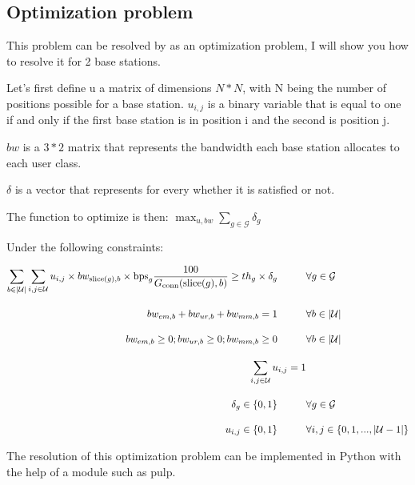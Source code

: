\documentclass[letterpaper]{article}
\begin{document}
\subsection{Optimization problem}

This problem can be resolved by as an optimization problem, I will show you how to resolve it for 2 base stations.

Let's first define u a matrix of dimensions $N*N$, with N being the number of positions possible for a base station.
$u_{i,j}$ is a binary variable that is equal to one if and only if the first base station is in position i and the second is position j.

$bw$ is a $3*2$ matrix that represents the bandwidth each base station allocates to each user class.

$\delta$ is a vector that represents for every whether it is satisfied or not.

The function to optimize is then: $\max_{u,bw}\sum_{g\in\mathcal{G}}\delta_g$

Under the following constraints:

\begin{subequations}
    \allowdisplaybreaks
    \begin{align}
        \sum_{b \in |\mathcal{U}|} \sum_{i, j \in \mathcal{U}} u_{i, j} \times bw_{\text{slice}(g), b} \times \text{bps}_g \frac{100}{G_{\text{conn}}(\text{slice}(g),b)} \nonumber
        \geq th_g \times \delta_g \hspace{1cm} &\forall g \in \mathcal{G} \\[1em]
        bw_{em,b} + bw_{ur,b} + bw_{mm,b} = 1 \hspace{1cm} &\forall b \in |\mathcal{U}| \\[1em]
        bw_{em,b} \geq 0; bw_{ur,b} \geq 0; bw_{mm,b} \geq 0 \hspace{1cm} &\forall b \in |\mathcal{U}| \\[1em]
        \sum_{i,j \in \mathcal{U}}u_{i,j} = 1 &\\[1em]
        \delta_g \in \{0, 1\} \hspace{1cm} &\forall g \in \mathcal{G} \\[1em] 
        u_{i,j} \in \{0, 1\} \hspace{1cm} &\forall i,j \in \{0, 1, ... , |\mathcal{U}-1|\}
    \end{align}\label{constr}
    \end{subequations}

The resolution of this optimization problem can be implemented in Python with the help of a module such as pulp.
\end{document}
